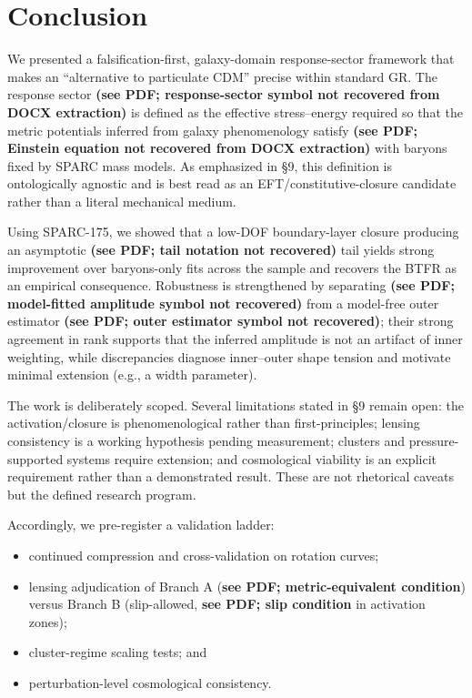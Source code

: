 \section{Conclusion}

We presented a falsification-first, galaxy-domain response-sector framework that makes an ``alternative to particulate CDM'' precise within standard GR. The response sector \textbf{(see PDF; response-sector symbol not recovered from DOCX extraction)} is defined as the effective stress--energy required so that the metric potentials inferred from galaxy phenomenology satisfy \textbf{(see PDF; Einstein equation not recovered from DOCX extraction)} with baryons fixed by SPARC mass models. As emphasized in \S9, this definition is ontologically agnostic and is best read as an EFT/constitutive-closure candidate rather than a literal mechanical medium.

Using SPARC-175, we showed that a low-DOF boundary-layer closure producing an asymptotic \textbf{(see PDF; tail notation not recovered)} tail yields strong improvement over baryons-only fits across the sample and recovers the BTFR as an empirical consequence. Robustness is strengthened by separating \textbf{(see PDF; model-fitted amplitude symbol not recovered)} from a model-free outer estimator \textbf{(see PDF; outer estimator symbol not recovered)}; their strong agreement in rank supports that the inferred amplitude is not an artifact of inner weighting, while discrepancies diagnose inner--outer shape tension and motivate minimal extension (e.g., a width parameter).

The work is deliberately scoped. Several limitations stated in \S9 remain open: the activation/closure is phenomenological rather than first-principles; lensing consistency is a working hypothesis pending measurement; clusters and pressure-supported systems require extension; and cosmological viability is an explicit requirement rather than a demonstrated result. These are not rhetorical caveats but the defined research program.

Accordingly, we pre-register a validation ladder:
\begin{itemize}
	\item continued compression and cross-validation on rotation curves;
	\item lensing adjudication of Branch A (\textbf{see PDF; metric-equivalent condition}) versus Branch B (slip-allowed, \textbf{see PDF; slip condition} in activation zones);
	\item cluster-regime scaling tests; and
	\item perturbation-level cosmological consistency.
\end{itemize}
